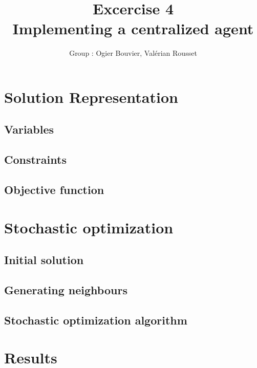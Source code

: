 \documentclass[11pt]{article}
\title{\bf Excercise 4\\ Implementing a centralized agent}
\author{Group \textnumero 17 : Ogier Bouvier, Valérian Rousset}
\begin{document}
\maketitle

\section{Solution Representation}

\subsection{Variables}

\subsection{Constraints}

\subsection{Objective function}


\section{Stochastic optimization}

\subsection{Initial solution}

\subsection{Generating neighbours}

\subsection{Stochastic optimization algorithm}


\section{Results}
\end{document}
